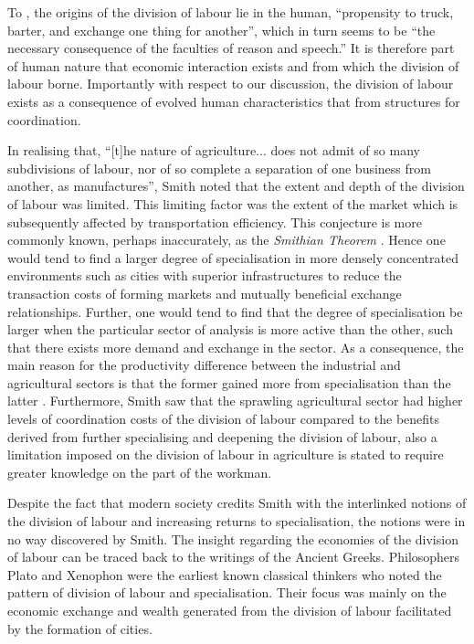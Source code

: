 To \citet[p.~13]{Smith1776}, the origins of the division of labour lie in the human, ``propensity to truck, barter, and exchange one thing for another'', which in turn seems to be ``the necessary consequence of the faculties of reason and speech.'' It is therefore part of human nature that economic interaction exists and from which the division of labour borne. Importantly with respect to our discussion, the division of labour exists as a consequence of evolved human characteristics that from structures for coordination.

In realising that, ``[t]he nature of agriculture... does not admit of so many subdivisions of labour, nor of so complete a separation of one business from another, as manufactures'', Smith noted that the extent and depth of the division of labour was limited. This limiting factor was the extent of the market which is subsequently affected by transportation efficiency. This conjecture is more commonly known, perhaps inaccurately, as the \textit{Smithian Theorem} \citep{Stigler1951}. Hence one would tend to find a larger degree of specialisation in more densely concentrated environments such as cities with superior infrastructures to reduce the transaction costs of forming markets and mutually beneficial exchange relationships. Further, one would tend to find that the degree of specialisation be larger when the particular sector of analysis is more active than the other, such that there exists more demand and exchange in the sector. As a consequence, the main reason for the productivity difference between the industrial and agricultural sectors is that the former gained more from specialisation than the latter \citep[p.~18]{Smith1776}. Furthermore, Smith saw that the sprawling agricultural sector had higher levels of coordination costs of the division of labour compared to the benefits derived from further specialising and deepening the division of labour, also a limitation imposed on the division of labour in agriculture is stated to require greater knowledge on the part of the workman.

Despite the fact that modern society credits Smith with the interlinked notions of the division of labour and increasing returns to specialisation, the notions were in no way discovered by Smith. The insight regarding the economies of the division of labour can be traced back to the writings of the Ancient Greeks. Philosophers Plato and Xenophon were the earliest known classical thinkers who noted the pattern of division of labour and specialisation. Their focus was mainly on the economic exchange and wealth generated from the division of labour facilitated by the formation of cities.

